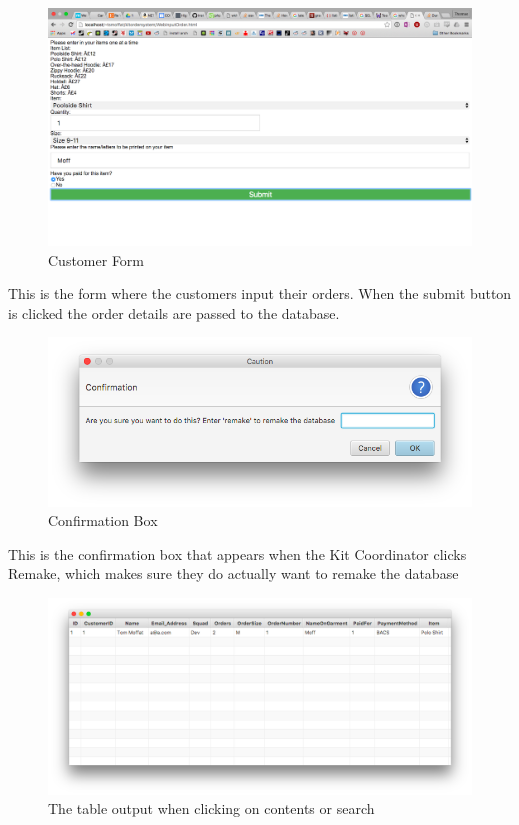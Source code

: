 \documentclass[11pt]{report}
\begin{document}
\begin{figure}[H]
	\centering
	\includegraphics[width=\linewidth]{OrderForm}
	\caption{Customer Form}
	\label{cf}
\end{figure}
This is the form where the customers input their orders. When the submit button is clicked the order details are passed to the database.
\begin{figure}[H]
	\centering
	\includegraphics[scale=0.5]{ConfirmBox}
	\caption{Confirmation Box}
	\label{cb}
\end{figure}
This is the confirmation box that appears when the Kit Coordinator clicks Remake, which makes sure they do actually want to remake the database
\begin{figure}[H]
	\centering
	\includegraphics[width=\linewidth]{OutputTable}
	\caption{The table output when clicking on contents or search}
	\label{ot}
\end{figure}
\end{document}
